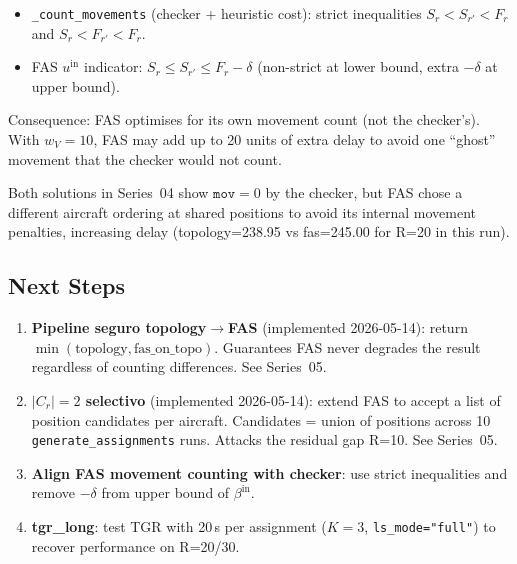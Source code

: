 \begin{itemize}[noitemsep]
    \item \texttt{\_count\_movements} (checker + heuristic cost): strict
          inequalities $S_r < S_{r'} < F_r$ and $S_r < F_{r'} < F_r$.
    \item FAS $u^{\mathrm{in}}$ indicator: $S_r \leq S_{r'} \leq F_r - \delta$
          (non-strict at lower bound, extra $-\delta$ at upper bound).
\end{itemize}

Consequence: FAS optimises for its own movement count (not the checker's).
With $w_V = 10$, FAS may add up to 20 units of extra delay to avoid one
``ghost'' movement that the checker would not count.

Both solutions in Series~04 show $\texttt{mov}=0$ by the checker, but FAS
chose a different aircraft ordering at shared positions to avoid its
internal movement penalties, increasing delay (topology=238.95 vs
fas=245.00 for R=20 in this run).

\subsection{Next Steps}
\label{exp:exp04-next}

\begin{enumerate}[noitemsep]
    \item \textbf{Pipeline seguro topology$\to$FAS} (implemented 2026-05-14):
          return $\min(\text{topology}, \text{fas\_on\_topo})$.
          Guarantees FAS never degrades the result regardless of counting
          differences.  See Series~05.
    \item \textbf{$|C_r|=2$ selectivo} (implemented 2026-05-14):
          extend FAS to accept a list of position candidates per aircraft.
          Candidates = union of positions across 10 \texttt{generate\_assignments}
          runs.  Attacks the residual gap R=10.  See Series~05.
    \item \textbf{Align FAS movement counting with checker}: use strict
          inequalities and remove $-\delta$ from upper bound of $\beta^{\mathrm{in}}$.
    \item \textbf{tgr\_long}: test TGR with 20\,s per assignment
          ($K=3$, \texttt{ls\_mode="full"}) to recover performance on R=20/30.
\end{enumerate}
